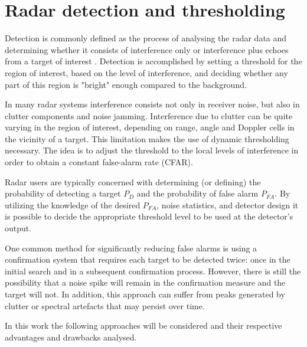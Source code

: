 \chapter{Radar detection and thresholding}
\label{chap:radar thresholding}

Detection is commonly defined as the process of analysing the radar data and determining whether it consists of interference only or interference plus echoes from a target of interest \cite{Richards_Scheer_Holm_2010}. Detection is accomplished by setting a threshold for the region of interest, based on the level of interference, and deciding whether any part of this region is "bright" enough compared to the background.

In many radar systems interference consists not only in receiver noise, but also in clutter components and noise jamming. Interference due to clutter can be quite varying in the region of interest, depending on range, angle and Doppler cells in the vicinity of a target. This limitation makes the use of dynamic thresholding necessary. The idea is to adjust the threshold to the local levels of interference in order to obtain a constant false-alarm rate (CFAR).


Radar users are typically concerned with determining (or defining) the probability of detecting a target $P_D$ and the probability of false alarm $P_{FA}$.  By utilizing the knowledge of the desired $P_{FA}$, noise statistics, and detector design it is possible to decide the appropriate threshold level to be used at the detector's output.


One common method for significantly reducing false alarms is using a confirmation system that requires each target to be detected twice: once in the initial search and in a subsequent confirmation process.
However, there is still the possibility that a noise spike will remain in the confirmation measure and the target will not. In addition, this approach can suffer from peaks generated by clutter or spectral artefacts that may persist over time. 


In this work the following approaches will be considered and their respective advantages and drawbacks analysed.



